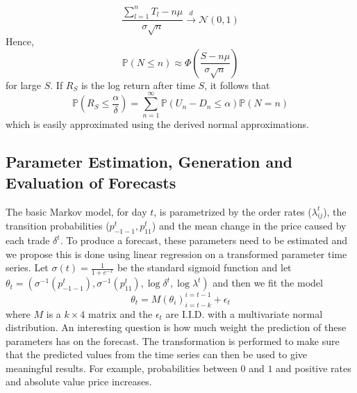 \documentclass[a4paper,10pt]{article}
\begin{document}
\begin{equation}
\frac{\sum_{l=1}^n T_l - n\mu}{\sigma \sqrt{n}} \xrightarrow{d} \mathcal{N}(0, 1)
\end{equation}
Hence,
\begin{equation}
\mathbb{P}(N \leq n) \approx \Phi\left(\frac{S - n\mu}{\sigma \sqrt{n}} \right)
\end{equation}
for large $S$. If $R_S$ is the log return after time $S$, it follows that
\begin{equation}
\mathbb{P}\left(R_S \leq \frac{\alpha}{\delta}\right) = \sum_{n=1}^{\infty} \mathbb{P}\left(U_n - D_n \leq \alpha\right)\mathbb{P}(N = n)
\end{equation}
which is easily approximated using the derived normal approximations.
\subsection{Parameter Estimation, Generation and Evaluation of Forecasts}
The basic Markov model, for day $t$, is parametrized by the order rates ($\lambda_{i j}^t$), the transition probabilities ($p_{-1-1}^t, p_{11}^t$) and the mean change in the price caused by each trade $\delta^t$. To produce a forecast, these parameters need to be estimated and we propose this is done using linear regression on a transformed parameter time series. Let $\sigma(t) = \frac{1}{1 + e^{-x}}$ be the standard sigmoid function and let $\theta_t = (\sigma^{-1}(p_{-1-1}^t), \sigma^{-1}(p_{11}^t), \log\delta^t, \log\lambda^t)$ and then we fit the model
\begin{equation}
\theta_t = M (\theta_i)_{i=t - k}^{i=t-1} + \epsilon_t 
\end{equation}
where $M$ is a $k \times 4$ matrix and the $\epsilon_t$ are I.I.D. with a multivariate normal distribution. An interesting question is how much weight the prediction of these parameters has on the forecast. The transformation is performed to make sure that the predicted values from the time series can then be used to give meaningful results. For example, probabilities between $0$ and $1$ and positive rates and absolute value price increases.
\end{document}
